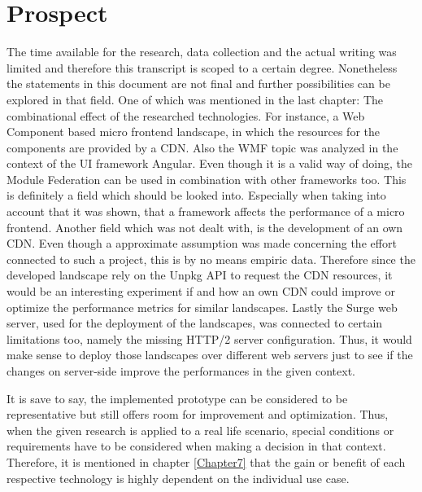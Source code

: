 \chapter{Prospect} %
\label{Chapter8}


The time available for the research, data collection and the actual writing was limited and therefore this transcript is scoped to a certain degree. Nonetheless the statements in this document are not final and further possibilities can be explored in that field. One of which was mentioned in the last chapter: The combinational effect of the researched technologies. For instance, a Web Component based micro frontend landscape, in which the resources for the components are provided by a CDN. Also the WMF topic was analyzed in the context of the UI framework Angular. Even though it is a valid way of doing, the Module Federation can be used in combination with other frameworks too. This is definitely a field which should be looked into. Especially when taking into account that it was shown, that a framework affects the performance of a micro frontend. 
Another field which was not dealt with, is the development of an own CDN. Even though a approximate assumption was made concerning the effort connected to such a project, this is by no means empiric data. Therefore since the developed landscape rely on the Unpkg API to request the CDN resources, it would be an interesting experiment if and how an own CDN could improve or optimize the performance metrics for similar landscapes.
Lastly the Surge web server, used for the deployment of the landscapes, was connected to certain limitations too, namely the missing HTTP/2 server configuration. Thus, it would make sense to deploy those landscapes over different web servers just to see if the changes on server-side improve the performances in the given context.

It is save to say, the implemented prototype can be considered to be representative but still offers room for improvement and optimization. Thus, when the given research is applied to a real life scenario, special conditions or requirements have to be considered when making a decision in that context. Therefore, it is mentioned in chapter \ref{Chapter7} that the gain or benefit of each respective technology is highly dependent on the individual use case.




